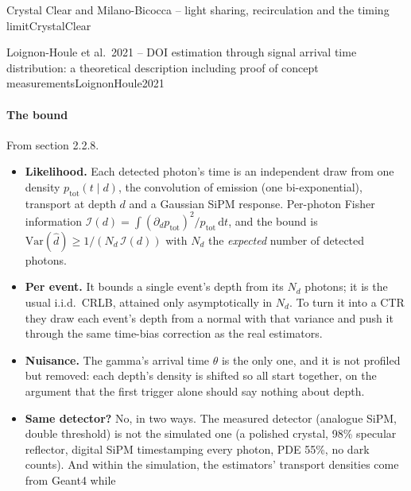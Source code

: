 \begin{programnote}{Crystal Clear and Milano-Bicocca -- light sharing, recirculation and the timing limit}{CrystalClear}
\begin{papernote}{Loignon-Houle et al.\ 2021 -- DOI estimation through signal arrival time distribution: a theoretical description including proof of concept measurements}{LoignonHoule2021}
\paragraph{The bound}
From section 2.2.8.
\begin{itemize}
	\item \textbf{Likelihood.} Each detected photon's time is an
		independent draw from one density $p_{\mathrm{tot}}(t \mid d)$, the
		convolution of emission (one bi-exponential), transport at depth $d$
		and a Gaussian SiPM response. Per-photon Fisher information
		$\mathcal{I}(d) = \int (\partial_d p_{\mathrm{tot}})^2 /
		p_{\mathrm{tot}}\,\mathrm{d}t$, and the bound is
		$\mathrm{Var}(\hat{d}) \geq 1/(N_d\,\mathcal{I}(d))$ with $N_d$ the
		\emph{expected} number of detected photons.
	\item \textbf{Per event.} It bounds a single event's depth from its
		$N_d$ photons; it is the usual i.i.d.\ CRLB, attained only
		asymptotically in $N_d$. To turn it into a CTR they draw each event's
		depth from a normal with that variance and push it through the same
		time-bias correction as the real estimators.
	\item \textbf{Nuisance.} The gamma's arrival time $\theta$ is the only
		one, and it is not profiled but removed: each depth's density is
		shifted so all start together, on the argument that the first trigger
		alone should say nothing about depth.
	\item \textbf{Same detector?} No, in two ways. The measured detector
		(analogue SiPM, double threshold) is not the simulated one (a
		 polished crystal, 98\% specular reflector, digital SiPM
		timestamping every photon, PDE 55\%, no dark counts). And within the
		simulation, the estimators' transport densities come from Geant4 while

\end{itemize}
\end{papernote}
\end{programnote}
